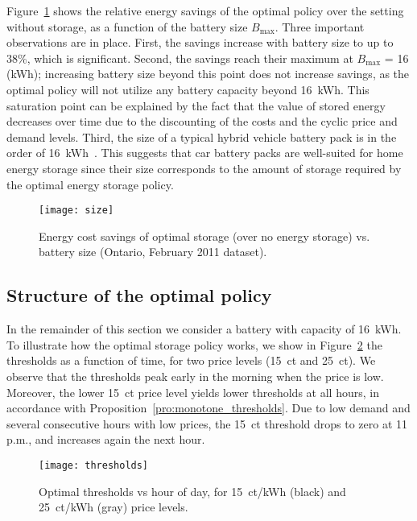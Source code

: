\documentclass[journal]{IEEEtran}
\newcommand\1{\mathbf{1}}
\begin{document}
Figure~\ref{fig:size} shows the relative energy savings of the optimal policy over the setting without storage, as a function of the battery size $B_{\max}$. Three important observations are in place. First, the savings increase with battery size to up to 38\%, which is significant. Second, the savings reach their maximum at $B_{\max}$ = 16 (kWh); increasing battery size beyond this point does not increase savings, as the optimal policy will not utilize any battery capacity beyond 16~kWh. This saturation point can be explained by the fact that the value of stored energy decreases over time due to the discounting of the costs and the cyclic price and demand levels. Third, the size of a typical hybrid vehicle battery pack is in the order of 16~kWh~\cite{PWA10}. This suggests that car battery packs are well-suited for home energy storage since their size corresponds to the amount of storage required by the optimal energy storage policy.
\begin{figure}[h]
    \begin{center}
        \texttt{[image: size]}
    \end{center}
    \caption{Energy cost savings of optimal storage (over no energy storage) vs. battery size (Ontario, February 2011 dataset).}
    \label{fig:size}
\end{figure}


\subsection{Structure of the optimal policy}


In the remainder of this section we consider a battery with capacity of 16~kWh. To illustrate how the optimal storage policy works, we show in Figure~\ref{fig:thresholds} the thresholds as a function of time, for two price levels (15~ct and 25~ct). We observe that the thresholds peak early in the morning when the price is low. Moreover, the lower 15~ct price level yields lower thresholds at all hours, in accordance with Proposition~\ref{pro:monotone_thresholds}. Due to low demand and several consecutive hours with low prices, the 15~ct threshold drops to zero at 11 p.m., and increases again the next hour.
\begin{figure}[h]
    \begin{center}
        \texttt{[image: thresholds]}
    \end{center}
    \caption{Optimal thresholds vs hour of day, for 15~ct/kWh (black) and 25~ct/kWh (gray) price levels.}
    \label{fig:thresholds}
\end{figure}
\end{document}
